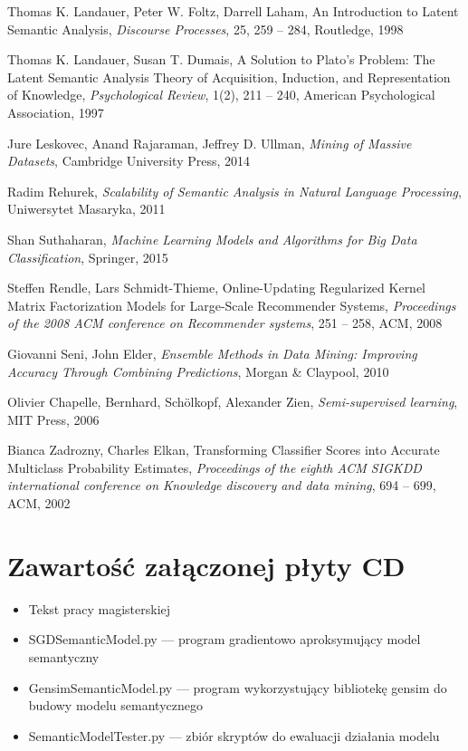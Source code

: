 \documentclass{pracamgr}
\begin{document}
\begin{thebibliography}{99}
 Thomas K. Landauer, Peter W. Foltz, Darrell Laham, An Introduction to Latent Semantic Analysis, \textit{Discourse Processes}, 25, 259 -- 284, Routledge, 1998

 Thomas K. Landauer, Susan T. Dumais, A Solution to Plato's Problem: The Latent Semantic Analysis Theory of Acquisition, Induction, and Representation of Knowledge, \textit{Psychological Review}, 1(2), 211 -- 240, American Psychological Association, 1997

 Jure Leskovec, Anand Rajaraman, Jeffrey D. Ullman, \textit{Mining of Massive Datasets}, Cambridge University Press, 2014

 Radim Rehurek, \textit{Scalability of Semantic Analysis in Natural Language Processing}, Uniwersytet Masaryka, 2011

 Shan Suthaharan, \textit{Machine Learning Models and Algorithms for Big Data Classification}, Springer, 2015

 Steffen Rendle, Lars Schmidt-Thieme, Online-Updating Regularized Kernel Matrix Factorization Models for Large-Scale Recommender Systems, \textit{Proceedings of the 2008 ACM conference on Recommender systems}, 251 -- 258, ACM, 2008

 Giovanni Seni, John Elder, \textit{Ensemble Methods in Data Mining: Improving Accuracy Through Combining Predictions}, Morgan \& Claypool, 2010

 Olivier Chapelle, Bernhard, Schölkopf, Alexander Zien, \textit{Semi-supervised learning}, MIT Press, 2006

 Bianca Zadrozny, Charles Elkan, Transforming Classifier Scores into Accurate Multiclass Probability Estimates, \textit{Proceedings of the eighth ACM SIGKDD international conference on Knowledge discovery and data mining}, 694 -- 699, ACM, 2002

\end{thebibliography}

\appendix
\chapter{Zawartość załączonej płyty CD}

\begin{itemize}
    \item Tekst pracy magisterskiej
    \item SGDSemanticModel.py --- program gradientowo aproksymujący model semantyczny
    \item GensimSemanticModel.py --- program wykorzystujący bibliotekę gensim do budowy modelu semantycznego
    \item SemanticModelTester.py --- zbiór skryptów do ewaluacji działania modelu
\end{itemize}
\end{document}
